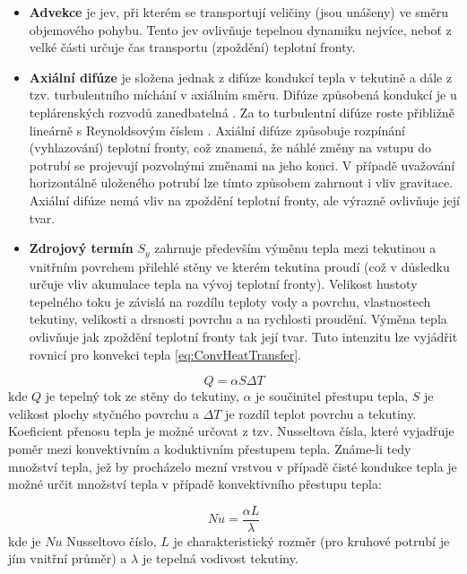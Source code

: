 \begin{itemize}
  \item
    \textbf{Advekce} je jev, při kterém se transportují veličiny (jsou unášeny)
    ve směru objemového pohybu. Tento jev ovlivňuje tepelnou dynamiku nejvíce,
    neboť z velké části určuje čas transportu (zpoždění) teplotní fronty.
  \item
    \textbf{Axiální difúze} je složena jednak z difúze kondukcí tepla v
    tekutině a dále z tzv. turbulentního míchání v axiálním směru. Difúze
    způsobená kondukcí je u teplárenských rozvodů zanedbatelná
    \cite{VanderHeijde2017a,VanderHeijde2017b}. Za to turbulentní difúze roste
    přibližně lineárně s Reynoldsovým číslem \cite{Chertkov2018}. Axiální
    difúze způsobuje rozpínání (vyhlazování) teplotní fronty, což znamená,
    že náhlé změny na vstupu do potrubí se projevují pozvolnými změnami na jeho
    konci. V případě uvažování horizontálně uloženého potrubí lze tímto
    způsobem zahrnout i vliv gravitace. Axiální difúze nemá vliv na zpoždění
    teplotní fronty, ale výrazně ovlivňuje její tvar.
  \item
    \textbf{Zdrojový termín} \(S_y\) zahrnuje především výměnu tepla mezi
    tekutinou a vnitřním povrchem přilehlé stěny ve kterém tekutina proudí (což
    v důsledku určuje vliv akumulace tepla na vývoj teplotní fronty). Velikost
    hustoty tepelného toku je závislá na rozdílu teploty vody a povrchu,
    vlastnostech tekutiny, velikosti a drsnosti povrchu a na rychlosti
    proudění. Výměna tepla ovlivňuje jak zpoždění teplotní fronty tak její
    tvar. Tuto intenzitu lze vyjádřit rovnicí pro konvekci tepla
    \ref{eq:ConvHeatTransfer}.
\end{itemize}

\begin{equation}
  \label{eq:ConvHeatTransfer}
  Q = \alpha S \Delta T
\end{equation}
kde \(Q\) je tepelný tok ze stěny do tekutiny, \(\alpha\) je součinitel přestupu
tepla, \(S\) je velikost plochy styčného povrchu a \(\Delta T\) je rozdíl
teplot povrchu a tekutiny. Koeficient přenosu tepla  je možné určovat z
tzv. Nusseltova čísla, které vyjadřuje poměr mezi konvektivním a koduktivním
přestupem tepla. Známe-li tedy množství tepla, jež by procházelo mezní vrstvou
v případě čisté kondukce tepla je možné určit množství tepla v případě
konvektivního přestupu tepla:

\begin{equation}
  \label{eq:NusseltDef}
  Nu = \frac{\alpha L}{\lambda}
\end{equation}
kde je \(Nu\) Nusseltovo číslo, \(L\) je charakteristický rozměr (pro kruhové
potrubí je jím vnitřní průměr) a \(\lambda\) je tepelná vodivost tekutiny.


